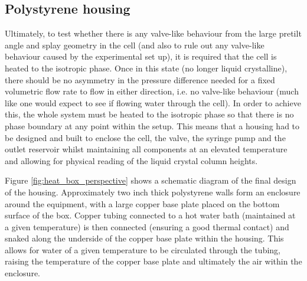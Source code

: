 \subsection{Polystyrene housing}
Ultimately, to test whether there is any valve-like behaviour from the large pretilt angle and splay geometry in the cell (and also to rule out any valve-like behaviour caused by the experimental set up), it is required that the cell is heated to the isotropic phase. Once in this state (no longer liquid crystalline), there should be no asymmetry in the pressure difference needed for a fixed volumetric flow rate to flow in either direction, i.e. no valve-like behaviour (much like one would expect to see if flowing water through the cell). In order to achieve this, the whole system must be heated to the isotropic phase so that there is no phase boundary at any point within the setup. This means that a housing had to be designed and built to enclose the cell, the valve, the syringe pump and the outlet reservoir whilst maintaining all components at an elevated temperature and allowing for physical reading of the liquid crystal column heights.

Figure \ref{fig:heat_box_perspective} shows a schematic diagram of the final design of the housing. Approximately two inch thick polystyrene walls form an enclosure around the equipment, with a large copper base plate placed on the  bottom surface of the box. Copper tubing connected to a hot water bath (maintained at a given temperature) is then connected (ensuring a good thermal contact) and snaked along the underside of the copper base plate within the housing. This allows for water of a given temperature to be circulated through the tubing, raising the temperature of the copper base plate and ultimately the air within the enclosure.

